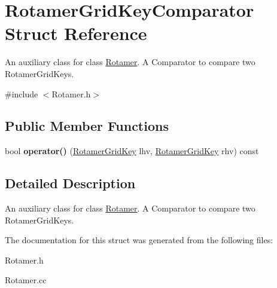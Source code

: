 \hypertarget{structRotamerGridKeyComparator}{\section{Rotamer\-Grid\-Key\-Comparator Struct Reference}
\label{structRotamerGridKeyComparator}
}


An auxiliary class for class \hyperlink{classRotamer}{Rotamer}. A Comparator to compare two Rotamer\-Grid\-Keys.  




{\ttfamily \#include $<$Rotamer.\-h$>$}

\subsection*{Public Member Functions}
\begin{DoxyCompactItemize}
\item 
\hypertarget{structRotamerGridKeyComparator_a6b1f39d7ccb3a94e284241058b02adc9}{bool {\bfseries operator()} (\hyperlink{classRotamerGridKey}{Rotamer\-Grid\-Key} lhv, \hyperlink{classRotamerGridKey}{Rotamer\-Grid\-Key} rhv) const }\label{structRotamerGridKeyComparator_a6b1f39d7ccb3a94e284241058b02adc9}

\end{DoxyCompactItemize}


\subsection{Detailed Description}
An auxiliary class for class \hyperlink{classRotamer}{Rotamer}. A Comparator to compare two Rotamer\-Grid\-Keys. 

The documentation for this struct was generated from the following files\-:\begin{DoxyCompactItemize}
\item 
Rotamer.\-h\item 
Rotamer.\-cc\end{DoxyCompactItemize}
